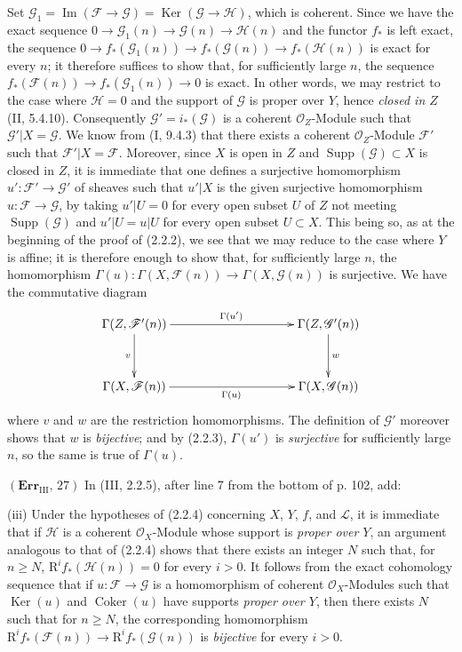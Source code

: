 \documentclass[10pt,oneside]{book}
\newcommand{\sh}[1]{\mathscr{#1}}
\newcommand{\RR}{\mathrm R}
\newcommand{\Ker}{\operatorname{Ker}}
\newcommand{\Coker}{\operatorname{Coker}}
\newcommand{\oldpage}[2][]{\setcounter{footnote}{0}\marginpar{\scriptsize\textbf{#1}~|~#2}\ignorespaces}
\begin{document}
\oldpage[III]{222}
Set
$\sh{G}_1=\operatorname{Im}(\sh{F}\to\sh{G})
=\operatorname{Ker}(\sh{G}\to\sh{H})$, which is coherent. Since we have the
exact sequence $0\to\sh{G}_1(n)\to\sh{G}(n)\to\sh{H}(n)$ and the functor
$f_*$ is left exact, the sequence
$0\to f_*(\sh{G}_1(n))\to f_*(\sh{G}(n))\to f_*(\sh{H}(n))$ is exact for every
$n$; it therefore suffices to show that, for sufficiently large $n$, the
sequence $f_*(\sh{F}(n))\to f_*(\sh{G}_1(n))\to0$ is exact. In other words, we
may restrict to the case where $\sh{H}=0$ and the support of $\sh{G}$ is
proper over $Y$, hence \emph{closed in $Z$} (II, 5.4.10). Consequently
$\sh{G}'=i_*(\sh{G})$ is a coherent $\sh{O}_Z$-Module such that
$\sh{G}'|X=\sh{G}$. We know from (I, 9.4.3) that there exists a coherent
$\sh{O}_Z$-Module $\sh{F}'$ such that $\sh{F}'|X=\sh{F}$. Moreover, since $X$
is open in $Z$ and $\operatorname{Supp}(\sh{G})\subset X$ is closed in $Z$, it
is immediate that one defines a surjective homomorphism
$u':\sh{F}'\to\sh{G}'$ of sheaves such that $u'|X$ is the given surjective
homomorphism $u:\sh{F}\to\sh{G}$, by taking $u'|U=0$ for every open subset $U$
of $Z$ not meeting $\operatorname{Supp}(\sh{G})$ and $u'|U=u|U$ for every open
subset $U\subset X$. This being so, as at the beginning of the proof of
(2.2.2), we see that we may reduce to the case where $Y$ is affine; it is
therefore enough to show that, for sufficiently large $n$, the homomorphism
$\Gamma(u):\Gamma(X,\sh{F}(n))\to\Gamma(X,\sh{G}(n))$ is surjective. We have
the commutative diagram
\[
\xymatrix@C=35mm@R=12mm{
\Gamma(Z,\sh{F}'(n)) \ar[r]^{\Gamma(u')} \ar[d]_v &
\Gamma(Z,\sh{G}'(n)) \ar[d]^w \\
\Gamma(X,\sh{F}(n)) \ar[r]_{\Gamma(u)} & \Gamma(X,\sh{G}(n))
}
\]
where $v$ and $w$ are the restriction homomorphisms. The definition of
$\sh{G}'$ moreover shows that $w$ is \emph{bijective}; and by (2.2.3),
$\Gamma(u')$ is \emph{surjective} for sufficiently large $n$, so the same is
true of $\Gamma(u)$.

\noindent\textbf{$(\mathbf{Err}_{\mathrm{III}},\,27)$} In (III, 2.2.5),
after line 7 from the bottom of p. 102, add:

(iii) Under the hypotheses of (2.2.4) concerning $X$, $Y$, $f$, and $\sh{L}$,
it is immediate that if $\sh{H}$ is a coherent $\sh{O}_X$-Module whose support
is \emph{proper over $Y$}, an argument analogous to that of (2.2.4) shows
that there exists an integer $N$ such that, for $n\geq N$,
$\RR^if_*(\sh{H}(n))=0$ for every $i>0$. It follows from the exact
cohomology sequence that if $u:\sh{F}\to\sh{G}$ is a homomorphism of coherent
$\sh{O}_X$-Modules such that $\Ker(u)$ and $\Coker(u)$ have supports
\emph{proper over $Y$}, then there exists $N$ such that for $n\geq N$, the
corresponding homomorphism
$\RR^if_*(\sh{F}(n))\to\RR^if_*(\sh{G}(n))$ is \emph{bijective} for every
$i>0$.
\end{document}
